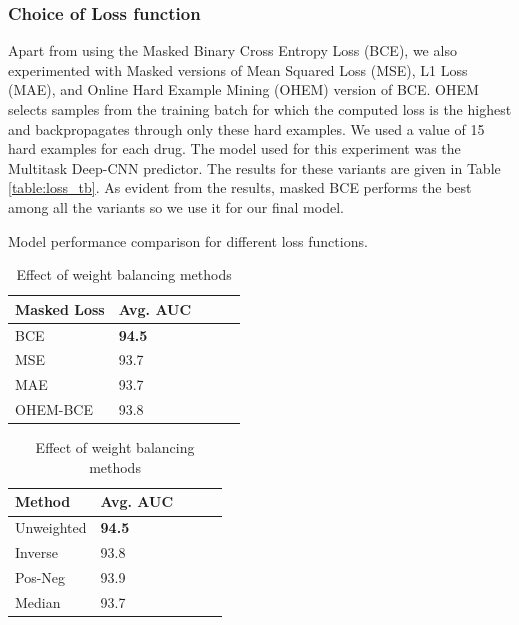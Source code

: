 \documentclass{article}
\begin{document}
\subsubsection{Choice of Loss function}
Apart from using the Masked Binary Cross Entropy Loss (BCE), we also experimented with Masked versions of Mean Squared Loss
(MSE), L1 Loss (MAE), and Online Hard Example Mining (OHEM)\cite{shrivastava2016training} version of BCE. OHEM selects
samples from the training batch for which the computed loss is the highest and backpropagates
through only these hard examples. We used a value of 15 hard examples for each drug. The model used for this experiment
was the Multitask Deep-CNN predictor. The results for these variants are given in Table \ref{table:loss_tb}.
As evident from the results, masked BCE performs the best among all the variants so we use it for our final model.
\begin{table}[t]
  \begin{minipage}{0.5\linewidth}
  \centering
  \caption{Model performance comparison for different loss functions.}
  \begin{tabular}{lllll}
      \toprule
      \multirow{1}{*}[0em]{Masked Loss} & Avg. AUC\\
      \midrule
      BCE & \textbf{94.5} \\
      MSE & 93.7 \\
      MAE & 93.7 \\
      OHEM-BCE & 93.8 \\
      \bottomrule
  \end{tabular}
  \label{table:loss_tb}
\end{minipage}
\begin{minipage}{0.5\linewidth}
  \centering
  \caption{Effect of weight balancing methods}
  \begin{tabular}{lllll}
      \toprule
      \multirow{1}{*}[0em]{Method} & Avg. AUC\\
      \midrule
      Unweighted & \textbf{94.5} \\
      Inverse & 93.8 \\
      Pos-Neg & 93.9 \\
      Median & 93.7 \\
      \bottomrule
  \end{tabular}
  \label{table:weight_balance}
\end{minipage}
\end{table}
\end{document}
